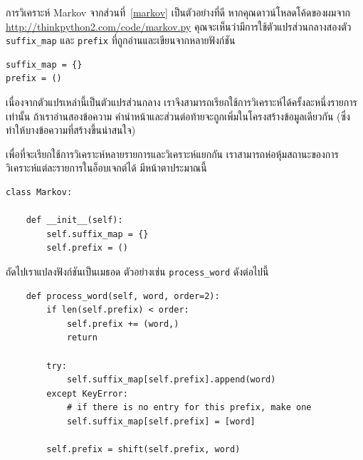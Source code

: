การวิเคราะห์ Markov จากส่วนที่~\ref{markov} เป็นตัวอย่างที่ดี หากคุณดาวน์โหลดโค้ดของผมจาก \url{http://thinkpython2.com/code/markov.py} 
คุณจะเห็นว่ามีการใช้ตัวแปรส่วนกลางสองตัว \verb"suffix_map" และ \verb"prefix" ที่ถูกอ่านและเขียนจากหลายฟังก์ชัน


\begin{verbatim}
suffix_map = {}        
prefix = ()            
\end{verbatim}


เนื่องจากตัวแปรเหล่านี้เป็นตัวแปรส่วนกลาง เราจึงสามารถเรียกใช้การวิเคราะห์ได้ครั้งละหนึ่งรายการเท่านั้น 
ถ้าเราอ่านสองข้อความ คำนำหน้าและส่วนต่อท้ายจะถูกเพิ่มในโครงสร้างข้อมูลเดียวกัน (ซึ่งทำให้บางข้อความที่สร้างขึ้นน่าสนใจ)


เพื่อที่จะเรียกใช้การวิเคราะห์หลายรายการและวิเคราะห์แยกกัน เราสามารถห่อหุ้มสถานะของการวิเคราะห์แต่ละรายการในอ็อบเจกต์ได้ มีหน้าตาประมาณนี้

\begin{verbatim}
class Markov:

    def __init__(self):
        self.suffix_map = {}
        self.prefix = ()    
\end{verbatim}


ถัดไปเราแปลงฟังก์ชันเป็นเมธอด ตัวอย่างเช่น \verb"process_word" ดังต่อไปนี้

\begin{verbatim}
    def process_word(self, word, order=2):
        if len(self.prefix) < order:
            self.prefix += (word,)
            return

        try:
            self.suffix_map[self.prefix].append(word)
        except KeyError:
            # if there is no entry for this prefix, make one
            self.suffix_map[self.prefix] = [word]

        self.prefix = shift(self.prefix, word)        
\end{verbatim}



